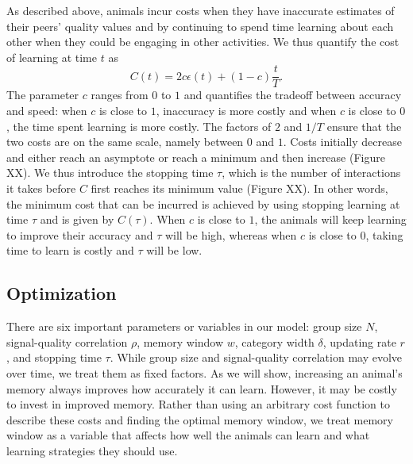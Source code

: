 As described above, animals incur costs when they have inaccurate estimates of their peers' quality values and by continuing to spend time learning about each other when they could be engaging in other activities. We thus quantify the cost of learning at time $t$ as 
\begin{equation*}
C(t) = 2c\epsilon(t) +(1-c)\frac{t}{T}.
\end{equation*}  
The parameter $c$ ranges from $0$ to $1$ and quantifies the tradeoff between accuracy and speed: when $c$ is close to $1$, inaccuracy is more costly and when $c$ is close to $0$, the time spent learning is more costly. The factors of $2$ and $1/T$ ensure that the two costs are on the same scale, namely between $0$ and $1$. 
Costs initially decrease and either reach an asymptote or reach a minimum and then increase (Figure XX). We thus introduce the stopping time $\tau$, which is the number of interactions it takes before $C$ first reaches its minimum value (Figure XX). In other words, the minimum cost that can be incurred is achieved by using stopping learning at time $\tau$ and is given by $C(\tau)$. When $c$ is close to $1$, the animals will keep learning to improve their accuracy and $\tau$ will be high, whereas when $c$ is close to $0$, taking time to learn is costly and $\tau$ will be low. 

\subsection{Optimization }

There are six important parameters or variables in our model: group size $N$, signal-quality correlation $\rho$, memory window $w$, category width $\delta$, updating rate $r$, and stopping time $\tau$. While group size and signal-quality correlation may evolve over time, we treat them as fixed factors. As we will show, increasing an animal's memory always improves how accurately it can learn. However, it may be costly to invest in improved memory. Rather than using an arbitrary cost function to describe these costs and finding the optimal memory window, we treat memory window as a variable that affects how well the animals can learn and what learning strategies they should use. 

